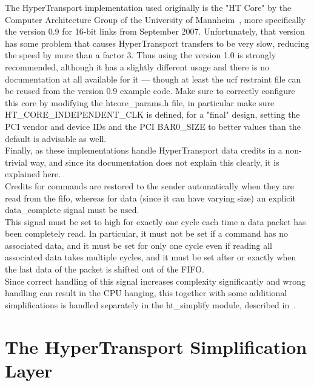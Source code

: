 The HyperTransport implementation used originally is the "HT Core" by the
Computer Architecture Group of the University of Mannheim~\cite{htcore},
more specifically the version 0.9 for 16-bit links from September 2007.
Unfortunately, that version has some problem that causes HyperTransport
transfers to be very slow, reducing the speed by more than a factor 3.
Thus using the version 1.0 is strongly recommended, although it has
a slightly different usage and there is no documentation at all available
for it --- though at least the ucf restraint file can be reused from
the version 0.9 example code.
Make sure to correctly configure this core by modifying the htcore\_params.h
file, in particular make sure HT\_CORE\_INDEPENDENT\_CLK is defined,
for a "final" design, setting the PCI vendor and device IDs and the
PCI BAR0\_SIZE to better values than the default is advisable as well.\\
Finally, as these implementations handle HyperTransport data credits in a
non-trivial way, and since its documentation does not explain this clearly, it is
explained here.\\
Credits for commands are restored to the sender automatically when they are
read from the fifo, whereas for data (since it can have varying size) an
explicit data\_complete signal must be used.\\
This signal must be set to high for exactly one cycle each time a data packet
has been completely read. In particular, it must not be set if a command
has no associated data, and it must be set for only one cycle even if reading
all associated data takes multiple cycles, and it must be set after or
exactly when the last data of the packet is shifted out of the FIFO.\\
Since correct handling of this signal increases complexity significantly
and wrong handling can result in the CPU hanging, this together with some
additional simplifications is handled separately in the ht\_simplify module,
described in~.

\section{The HyperTransport Simplification Layer}
\label{sec:htsimplify}


